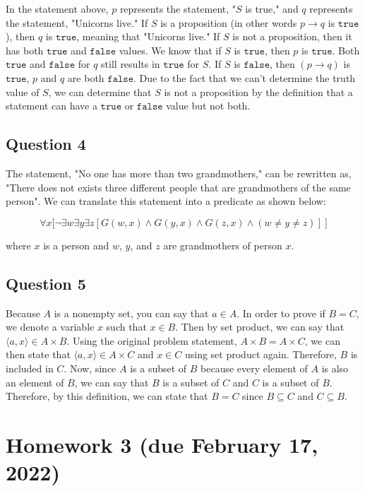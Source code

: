 \documentclass[letterpaper, 12pt]{article}
\begin{document}
In the statement above, $p$ represents the statement, "$S$ is true," and $q$ represents the statement, "Unicorns live." If $S$ is a proposition (in other words $p \to q$ is $\texttt{true}$), then $q$ is $\texttt{true}$, meaning that "Unicorns live." If $S$ is not a proposition, then it has both $\texttt{true}$ and $\texttt{false}$ values. We know that if $S$ is $\texttt{true}$, then $p$ is $\texttt{true}$. Both $\texttt{true}$ and $\texttt{false}$ for $q$ still results in $\texttt{true}$ for $S$. If $S$ is $\texttt{false}$, then $(p \to q)$ is $\texttt{true}$, $p$ and $q$ are both $\texttt{false}$. Due to the fact that we can't determine the truth value of $S$, we can determine that $S$ is not a proposition by the definition that a statement can have a $\texttt{true}$ or $\texttt{false}$ value but not both.

\subsection*{Question 4}
The statement, "No one has more than two grandmothers," can be rewritten as, "There does not exists three different people that are grandmothers of the same person". We can translate this statement into a predicate as shown below:

\[
\forall x \Bigg[ \neg \exists w \exists y \exists z [ G(w,x) \land G(y,x) \land G(z,x) \land (w \neq y \neq z)] \> \Bigg]
\]

where $x$ is a person and $w$, $y$, and $z$ are grandmothers of person $x$.

\subsection*{Question 5}
Because $A$ is a nonempty set, you can say that $a \in A$. In order to prove if $B = C$, we denote a variable $x$ such that $x \in B$. Then by set product, we can say that $\langle a,x \rangle \in A \times B$. Using the original problem statement, $A \times B = A \times C$, we can then state that $\langle a,x \rangle \in A \times C$ and $x \in C$ using set product again. Therefore, $B$ is included in $C$. Now, since $A$ is a subset of $B$ because every element of $A$ is also an element of $B$, we can say that $B$ is a subset of $C$ and $C$ is a subset of $B$. Therefore, by this definition, we can state that $B = C$ since $B \subseteq C$ and $C \subseteq B$.

\section*{Homework 3 (due February 17, 2022)}
\end{document}
